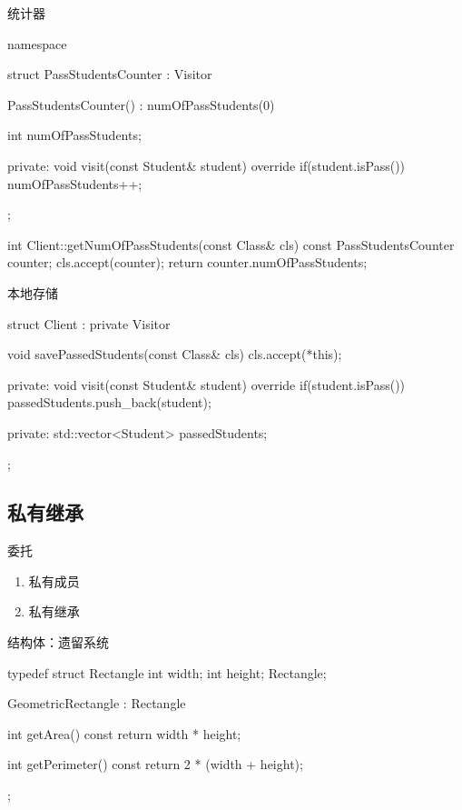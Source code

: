 \begin{frame}[fragile]{统计器}
\begin{c++}
namespace {
  struct PassStudentsCounter : Visitor 
  { 
    PassStudentsCounter() : numOfPassStudents(0) {} 
    
    int numOfPassStudents; 

  private:
    void visit(const Student& student) override { 
      if(student.isPass()) numOfPassStudents++; 
    }
  }; 
}

int Client::getNumOfPassStudents(const Class& cls) const { 
  PassStudentsCounter counter;
  cls.accept(counter);
  return counter.numOfPassStudents; 
}
\end{c++}
\end{frame}

\begin{frame}[fragile]{本地存储}
\begin{c++}
struct Client : private Visitor { 
  void savePassedStudents(const Class& cls) { 
    cls.accept(*this); 
  } 

private:
  void visit(const Student& student) override { 
    if(student.isPass()) {
      passedStudents.push_back(student); 
    }
  } 

private:
  std::vector<Student> passedStudents;
};
\end{c++}
\end{frame}


\subsection{私有继承}

\begin{frame}[fragile]{委托}
\begin{enumerate}
  \item 私有成员
  \item 私有继承
\end{enumerate}
\end{frame}

\begin{frame}[fragile]{结构体：遗留系统}
\begin{c++}
typedef struct Rectangle
{
   int width;
   int height;
} Rectangle;

GeometricRectangle : Rectangle {
  int getArea() const { 
    return width * height; 
  }

  int getPerimeter() const { 
    return 2 * (width + height); 
  }
};
\end{c++}
\end{frame}

